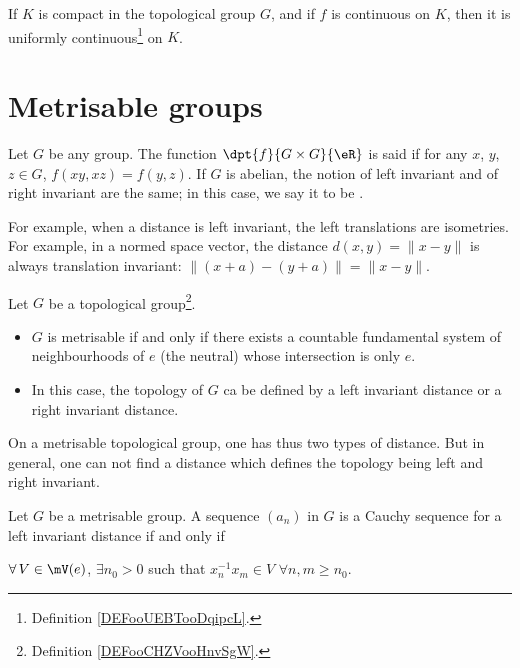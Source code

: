 \begin{proposition} \label{PROPooSHBAooVRdAFM}
	If \( K\) is compact in the topological group \( G\), and if \( f\) is continuous on \( K\), then it is uniformly continuous\footnote{Definition \ref{DEFooUEBTooDqipcL}.} on \( K\).
\end{proposition}

\section{Metrisable groups}\label{sec:metrisable_groups}

Let $G$ be any group. The function $\dpt{f}{G\times G}{\eR}$ is said  if for any $x$, $y$, $z\in G$, $f(xy,xz)=f(y,z)$. If $G$ is abelian, the notion of left invariant and of right invariant are the same; in this case, we say it to be .

For example, when a distance is left invariant, the left translations are isometries. For example, in a normed space vector, the distance $d(x,y)=\|x-y\|$ is always translation invariant: $\| (x+a)-(y+a) \|=\|x-y\|$.



\begin{proposition}
	Let $G$ be a topological group\footnote{Definition \ref{DEFooCHZVooHnvSgW}.}.
	\begin{itemize}
		\item $G$ is metrisable if and only if there exists a countable fundamental system of neighbourhoods of $e$ (the neutral) whose intersection is only $e$.
		\item In this case, the topology of $G$ ca be defined by a left invariant distance or a right invariant distance.
	\end{itemize}
\end{proposition}




On a metrisable topological group, one has thus two types of distance. But in general, one can not find a distance which defines the topology being left and right invariant.

\begin{proposition}
	Let $G$ be a metrisable group. A sequence $(a_n)$ in $G$ is a Cauchy sequence for a left invariant distance if and only if

	$\forall\, V\in\mV(e)$, $\exists n_0>0$ such that $x_n^{-1} x_m\in V$ $\forall n,m\geq n_0$.
	\label{prop:Cauchy_metrisable}
\end{proposition}

